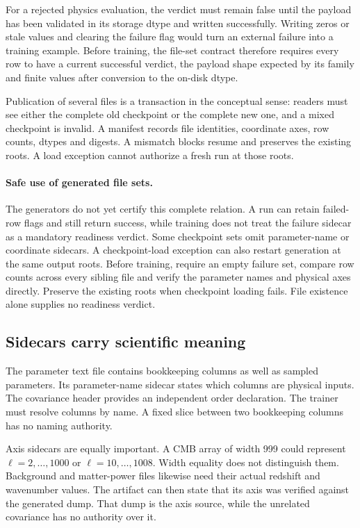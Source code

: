 \documentclass[10pt,aps,prd,twocolumn,nofootinbib]{revtex4-2}
\begin{document}
For a rejected physics evaluation, the verdict must remain false until the
payload has been validated in its storage dtype and written successfully.
Writing zeros or stale values and clearing the failure flag would turn an
external failure into a training example.  Before training, the file-set
contract therefore requires every row to have a current successful verdict,
the payload shape expected by its family and finite values after conversion
to the on-disk dtype.

Publication of several files is a transaction in the conceptual sense:
readers must see either the complete old checkpoint or the complete new one,
and a mixed checkpoint is invalid.  A manifest records file identities, coordinate axes, row
counts, dtypes and digests.  A mismatch blocks resume and preserves the
existing roots.  A load exception cannot authorize a fresh run at those roots.

\paragraph{Safe use of generated file sets.}
The generators do not yet certify this complete relation.  A run can retain
failed-row flags and still return success, while training does not treat the
failure sidecar as a mandatory readiness verdict.  Some checkpoint sets omit
parameter-name or coordinate sidecars.  A checkpoint-load exception can also
restart generation at the same output roots.  Before training, require an
empty failure set, compare row counts across every sibling file and verify the
parameter names and physical axes directly.  Preserve the existing roots when
checkpoint loading fails.  File existence alone supplies no readiness verdict.

\subsection{Sidecars carry scientific meaning}

The parameter text file contains bookkeeping columns as well as sampled
parameters.  Its parameter-name sidecar states which columns are physical
inputs.  The covariance header provides an independent order declaration.
The trainer must resolve columns by name.  A fixed slice between two
bookkeeping columns has no naming authority.

Axis sidecars are equally important.  A CMB array of width 999 could represent
\(\ell=2,\ldots,1000\) or \(\ell=10,\ldots,1008\).  Width equality does not
distinguish them.  Background and matter-power files likewise need their
actual redshift and wavenumber values.  The artifact can then state that its
axis was verified against the generated dump.  That dump is the axis source,
while the unrelated covariance has no authority over it.
\end{document}
